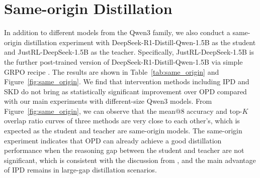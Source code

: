 \documentclass{article} %
\begin{document}
\begin{table}[!ht]
\centering
\small
\caption{Benchmark-wise mean@8 and best@8 accuracy for the top-$K$ coverage ablation.}
\label{tab:ablation_k_values}
\end{table}
\FloatBarrier


\section{Same-origin Distillation}
In addition to different models from the Qwen3 family, we also conduct a same-origin distillation experiment with DeepSeek-R1-Distill-Qwen-1.5B as the student and JustRL-DeepSeek-1.5B as the teacher. Specifically, JustRL-DeepSeek-1.5B is the further post-trained version of DeepSeek-R1-Distill-Qwen-1.5B via simple GRPO recipe \citep{he2025justrl}. The results are shown in Table~\ref{tab:same_origin} and Figure~\ref{fig:same_origin}. We find that intervention methods including IPD and SKD do not bring as statistically significant improvement over OPD compared with our main experiments with different-size Qwen3 models. From Figure~\ref{fig:same_origin}, we can observe that the mean@8 accuracy and top-$K$ overlap ratio curves of three methods are very close to each other's, which is expected as the student and teacher are same-origin models. The same-origin experiment indicates that OPD can already achieve a good distillation performance when the reasoning gap between the student and teacher are not significant, which is consistent with the discussion from \citet{li2026rethinking}, and the main advantage of IPD remains in large-gap distillation scenarios.
\end{document}

